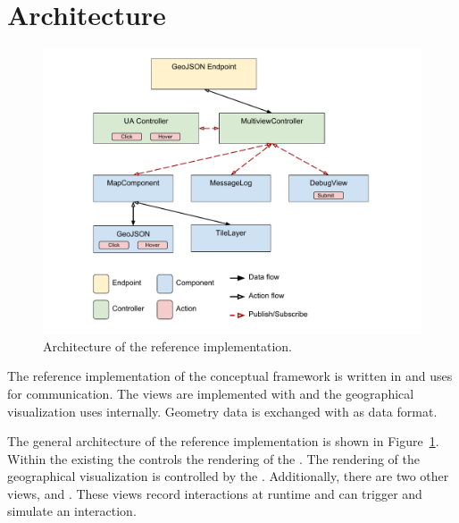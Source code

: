 \section{Architecture}


\begin{figure}[ht]
  \centering
  \includegraphics[width=\textwidth]{figures/implementation/thesis-architecture.pdf}
  \caption{%
    Architecture of the reference implementation.
  }\label{fig:implementation:architecture}
\end{figure}

The reference implementation of the conceptual framework is written in  and uses  for communication.
The views are implemented with  and the geographical visualization uses  internally.
Geometry data is exchanged with  as data format.

The general architecture of the reference implementation is shown in Figure~\ref{fig:implementation:architecture}.
Within the existing \visan{} the  controls the rendering of the \tmap{}.
The rendering of the geographical visualization is controlled by the .
Additionally, there are two other views,  and .
These views record interactions at runtime and can trigger and simulate an interaction.

